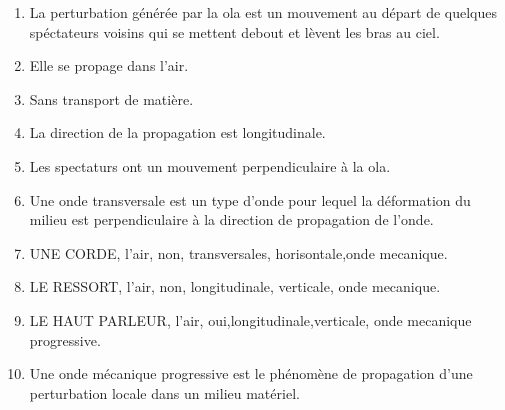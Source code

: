 \documentclass[12pt,a4paper]{article}
\begin{document}
\begin{center}
        \shadowbox{\begin{large}
                \textcolor{black}{Exercices }
        \end{large}}
    \end{center}
    \vspace{0.5 cm}
\begin{enumerate}
\item La perturbation générée par la ola est un mouvement au départ de quelques spéctateurs voisins qui se mettent debout et lèvent les bras au ciel.
\item Elle se propage dans l'air.
\item Sans transport de matière.
\item La direction de la propagation est longitudinale.
\item Les spectaturs ont un mouvement perpendiculaire à la ola.
\item Une onde transversale est un type d'onde pour lequel la déformation du milieu est perpendiculaire à la direction de propagation de l'onde.
\item UNE CORDE, l'air, non, transversales, horisontale,onde mecanique.
\item LE RESSORT, l'air, non, longitudinale, verticale, onde mecanique.
\item LE HAUT PARLEUR, l'air, oui,longitudinale,verticale, onde mecanique progressive.
\item Une onde mécanique progressive est le phénomène de propagation d'une perturbation locale dans un milieu matériel.

\end{enumerate}
\end{document}
